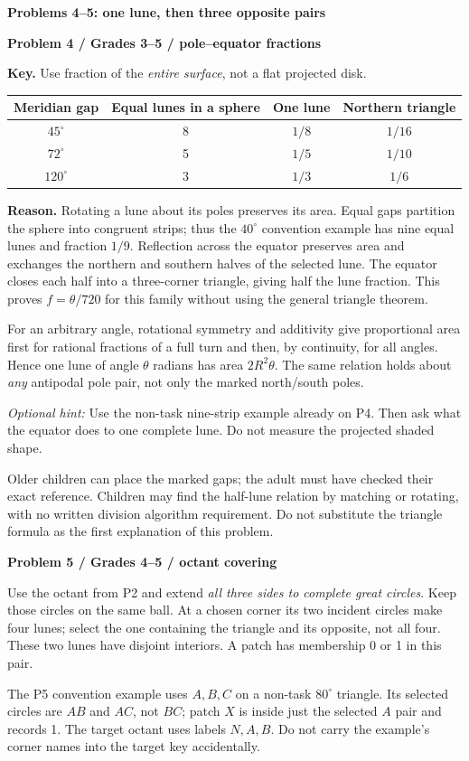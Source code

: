 \documentclass[11pt,letterpaper]{article}
\newcommand{\topic}[1]{\par{\large\bfseries\color{blue}#1}\par}
\newcommand{\sub}[1]{\par\textbf{#1}\par}
\newcommand{\hint}[1]{\textit{Optional hint:} #1\par}
\newcommand{\degc}{^\circ}
\begin{document}
\newpage
\topic{Problems 4--5: one lune, then three opposite pairs}
\sub{Problem 4 / Grades 3--5 / pole--equator fractions}
\textbf{Key.} Use fraction of the \emph{entire surface}, not a flat projected disk.
\begin{center}\begin{tabular}{c|c|c|c}
Meridian gap & Equal lunes in a sphere & One lune & Northern triangle\\\hline
$45\degc$ & 8 & $1/8$ & $1/16$\\
$72\degc$ & 5 & $1/5$ & $1/10$\\
$120\degc$ & 3 & $1/3$ & $1/6$
\end{tabular}\end{center}
\textbf{Reason.} Rotating a lune about its poles preserves its area. Equal gaps partition the sphere into congruent strips; thus the $40\degc$ convention example has nine equal lunes and fraction $1/9$. Reflection across the equator preserves area and exchanges the northern and southern halves of the selected lune. The equator closes each half into a three-corner triangle, giving half the lune fraction. This proves $f=\theta/720$ for this family without using the general triangle theorem.

For an arbitrary angle, rotational symmetry and additivity give proportional area first for rational fractions of a full turn and then, by continuity, for all angles. Hence one lune of angle $\theta$ radians has area $2R^2\theta$. The same relation holds about \emph{any} antipodal pole pair, not only the marked north/south poles.

\hint{Use the non-task nine-strip example already on P4. Then ask what the equator does to one complete lune. Do not measure the projected shaded shape.}
Older children can place the marked gaps; the adult must have checked their exact reference. Children may find the half-lune relation by matching or rotating, with no written division algorithm requirement. Do not substitute the triangle formula as the first explanation of this problem.

\sub{Problem 5 / Grades 4--5 / octant covering}
Use the octant from P2 and extend \emph{all three sides to complete great circles}. Keep those circles on the same ball. At a chosen corner its two incident circles make four lunes; select the one containing the triangle and its opposite, not all four. These two lunes have disjoint interiors. A patch has membership 0 or 1 in this pair.

The P5 convention example uses $A,B,C$ on a non-task $80\degc$ triangle. Its selected circles are $AB$ and $AC$, not $BC$; patch $X$ is inside just the selected $A$ pair and records 1. The target octant uses labels $N,A,B$. Do not carry the example's corner names into the target key accidentally.
\end{document}
